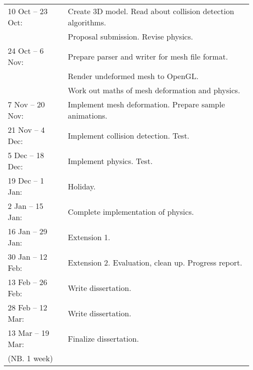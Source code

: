 \documentclass{article}
\begin{document}
\begin{tabular}{|l|l|}\hline
10 Oct -- 23 Oct: &
    Create 3D model. Read about collision detection algorithms. \\
&   Proposal submission. Revise physics.\\ \hline

24 Oct -- 6 Nov: &
    Prepare parser and writer for mesh file format. \\
&   Render undeformed mesh to OpenGL. \\
&   Work out maths of mesh deformation and physics. \\ \hline

7 Nov -- 20 Nov: &
    Implement mesh deformation.
    Prepare sample animations. \\ \hline

21 Nov -- 4 Dec: &
    Implement collision detection. Test. \\ \hline

5 Dec -- 18 Dec: &
    Implement physics. Test. \\ \hline

19 Dec -- 1 Jan: &
    Holiday. \\ \hline

2 Jan -- 15 Jan: &
    Complete implementation of physics. \\ \hline

16 Jan -- 29 Jan: &
    Extension 1. \\ \hline

30 Jan -- 12 Feb: &
    Extension 2.
    Evaluation, clean up.
    Progress report. \\ \hline

13 Feb -- 26 Feb: &
    Write dissertation. \\ \hline

28 Feb -- 12 Mar: &
    Write dissertation. \\ \hline

13 Mar -- 19 Mar: &
    Finalize dissertation. \\
(NB. 1 week) & \\ \hline
\end{tabular}
\end{document}
